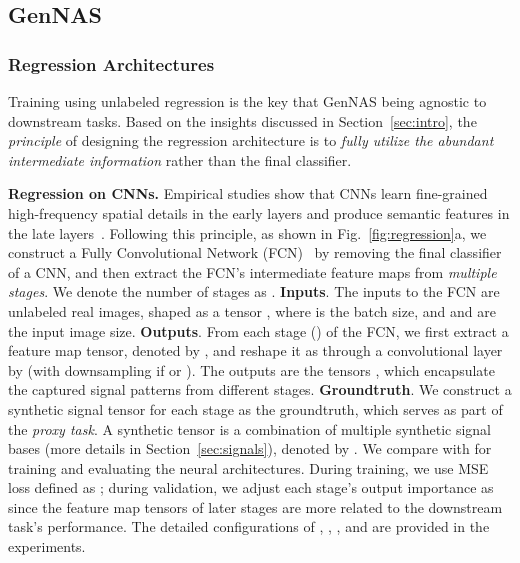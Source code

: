 \documentclass{article}
\begin{document}
\subsection{GenNAS} \label{sec:genNAS}

\subsubsection{Regression Architectures} 
\label{sec:regression_arch}

Training using unlabeled regression is the key that GenNAS being agnostic to downstream tasks.
Based on the insights discussed in Section~\ref{sec:intro}, the \textit{principle} of designing the regression architecture is to \textit{fully utilize the abundant intermediate information} rather than the final classifier.


\textbf{Regression on CNNs.}
Empirical studies show that CNNs learn fine-grained high-frequency spatial details in the early layers and produce semantic features in the late layers~\cite{wang2020high}. 
Following this principle, as shown in Fig.~\ref{fig:regression}a,
we construct a Fully Convolutional Network (FCN)~\cite{long2015fully} by removing the final classifier of a CNN, and then extract the FCN's intermediate feature maps from \textit{multiple stages}.
We denote the number of stages as .
\textbf{Inputs}. The inputs to the FCN are unlabeled real images, shaped as a tensor , where  is the batch size, and  and  are the input image size.
\textbf{Outputs}. From each stage  () of the FCN, we first extract a feature map tensor, denoted by ,
and reshape it as  through a convolutional layer  by  (with downsampling if  or ).
The outputs are the tensors , which encapsulate the captured signal patterns from different stages.
\textbf{Groundtruth}. We construct a synthetic signal tensor for each stage as the groundtruth, which serves as part of the \textit{proxy task}. A synthetic tensor is a combination of multiple synthetic signal bases (more details in Section~\ref{sec:signals}), denoted by .
We compare  with  for training and evaluating the neural architectures.
During training, we use MSE loss defined as ;
during validation, we adjust each stage's output importance as  since the feature map tensors of later stages are more related to the downstream task's performance.
The detailed configurations of , , , and  are provided in the experiments.
\end{document}
